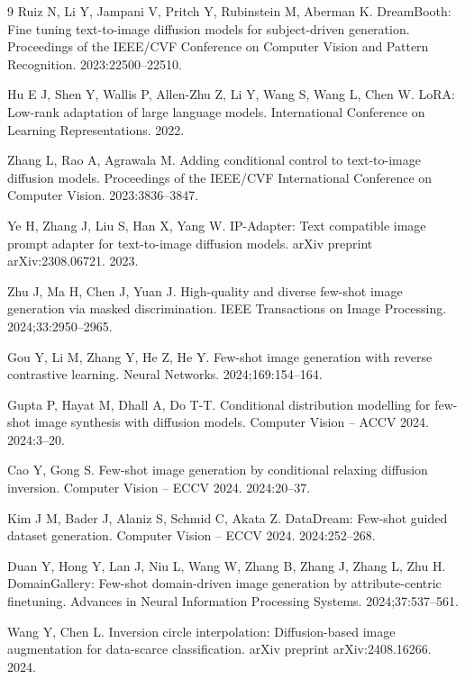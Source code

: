 \documentclass{article}
\begin{document}
\begin{thebibliography}{9}
Ruiz N, Li Y, Jampani V, Pritch Y, Rubinstein M, Aberman K. DreamBooth: Fine tuning text-to-image diffusion models for subject-driven generation. Proceedings of the IEEE/CVF Conference on Computer Vision and Pattern Recognition. 2023:22500--22510.

Hu E J, Shen Y, Wallis P, Allen-Zhu Z, Li Y, Wang S, Wang L, Chen W. LoRA: Low-rank adaptation of large language models. International Conference on Learning Representations. 2022.

Zhang L, Rao A, Agrawala M. Adding conditional control to text-to-image diffusion models. Proceedings of the IEEE/CVF International Conference on Computer Vision. 2023:3836--3847.

Ye H, Zhang J, Liu S, Han X, Yang W. IP-Adapter: Text compatible image prompt adapter for text-to-image diffusion models. arXiv preprint arXiv:2308.06721. 2023.

Zhu J, Ma H, Chen J, Yuan J. High-quality and diverse few-shot image generation via masked discrimination. IEEE Transactions on Image Processing. 2024;33:2950--2965.

Gou Y, Li M, Zhang Y, He Z, He Y. Few-shot image generation with reverse contrastive learning. Neural Networks. 2024;169:154--164.

Gupta P, Hayat M, Dhall A, Do T-T. Conditional distribution modelling for few-shot image synthesis with diffusion models. Computer Vision -- ACCV 2024. 2024:3--20.

Cao Y, Gong S. Few-shot image generation by conditional relaxing diffusion inversion. Computer Vision -- ECCV 2024. 2024:20--37.

Kim J M, Bader J, Alaniz S, Schmid C, Akata Z. DataDream: Few-shot guided dataset generation. Computer Vision -- ECCV 2024. 2024:252--268.

Duan Y, Hong Y, Lan J, Niu L, Wang W, Zhang B, Zhang J, Zhang L, Zhu H. DomainGallery: Few-shot domain-driven image generation by attribute-centric finetuning. Advances in Neural Information Processing Systems. 2024;37:537--561.

Wang Y, Chen L. Inversion circle interpolation: Diffusion-based image augmentation for data-scarce classification. arXiv preprint arXiv:2408.16266. 2024.


\end{thebibliography}
\end{document}
